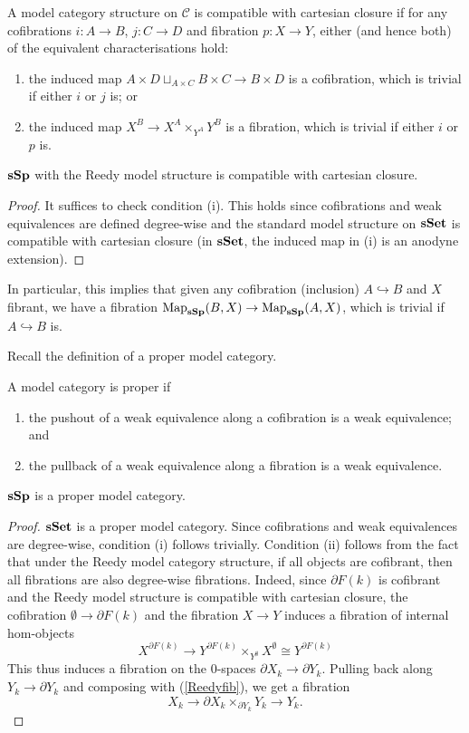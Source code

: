 \begin{refsection}
\begin{defin}
A model category structure on $\mathcal{C}$ is compatible with cartesian closure if for any cofibrations $i:A\to B$, $j:C\to D$ and fibration $p:X\to Y$, either (and hence both) of the equivalent characterisations hold:
\begin{enumerate}
\item the induced map $A\times D\sqcup_{A\times C}B\times C\to B\times D$ is a cofibration, which is trivial if either $i$ or $j$ is; or
\item the induced map $X^B\to X^A\times_{Y^A}Y^B$ is a fibration, which is trivial if either $i$ or $p$ is.
\end{enumerate}
\end{defin}

\begin{prop}
$\mathbf{sSp}$ with the Reedy model structure is compatible with cartesian closure.
\end{prop}
\begin{proof}
It suffices to check condition (i). This holds since cofibrations and weak equivalences are defined degree-wise and the standard model structure on $\mathbf{sSet}$ is compatible with cartesian closure (in $\mathbf{sSet}$, the induced map in (i) is an anodyne extension).
\end{proof}

In particular, this implies that given any cofibration (inclusion) $A\hookrightarrow B$ and $X$ fibrant, we have a fibration $\operatorname{\mathrm{Map}}_{\mathbf{sSp}}(B,X)\to\operatorname{\mathrm{Map}}_{\mathbf{sSp}}(A,X)$, which is trivial if $A\hookrightarrow B$ is.

Recall the definition of a proper model category.
\begin{defin}
A model category is proper if
\begin{enumerate}
\item the pushout of a weak equivalence along a cofibration is a weak equivalence; and
\item the pullback of a weak equivalence along a fibration is a weak equivalence.
\end{enumerate}
\end{defin}

\begin{prop}
$\mathbf{sSp}$ is a proper model category.
\end{prop}
\begin{proof}
$\mathbf{sSet}$ is a proper model category. Since cofibrations and weak equivalences are degree-wise, condition (i) follows trivially.
Condition (ii) follows from the fact that under the Reedy model category structure, if all objects are cofibrant, then all fibrations are also degree-wise fibrations. Indeed, since $\partial F(k)$ is cofibrant and the Reedy model structure is compatible with cartesian closure, the cofibration $\emptyset\to\partial F(k)$ and the fibration $X\to Y$ induces a fibration of internal hom-objects
$$X^{\partial F(k)}\to Y^{\partial F(k)}\times_{Y^\emptyset}X^\emptyset\cong Y^{\partial F(k)}$$
This thus induces a fibration on the 0-spaces $\partial X_k\to\partial Y_k$. Pulling back along $Y_k\to\partial Y_k$ and composing with (\ref{Reedyfib}), we get a fibration
$$X_k\to\partial X_k\times_{\partial Y_k}Y_k\to Y_k.$$
\end{proof}


\end{refsection}
